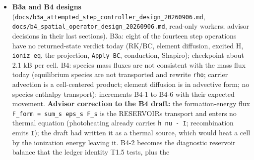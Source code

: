 \documentclass[english,a4paper]{my_memo}
\begin{document}
\begin{itemize}
  3.3e-8 at dt and 5.6e-9 at dt/16 on the old scale (crossing the 1e-8
  floor with the defect unchanged); now 1.0e-7 at every dt. Impact:
  \texttt{mol\_carrier}, \texttt{mol\_base\_handoff} identical; \texttt{oxygen\_chemistry} is refused
  at step 2 (CO row 5.5e-8 beside a clamped cell; 37 retry attempts to the
  floor, all refused, entry state restored), and the old measure only
  postponed that refusal to step 88 on today\textquotesingle s tree. Finding carried
  forward (A1scale2, needs its own impact measurement): with a
  dt-independent acceptance there is a shortest certifiable substep, since
  the Newton\textquotesingle s stopping test is still relative to the full terms and the
  round-off it leaves grows as 1/dt against the physical terms; the same
  measure in both places closes it. Also: \texttt{cterms} in \texttt{steady\_newton.f90}
  (534, 645) is written and never read.
  \textbf{Consequence for the matrix:} \texttt{oxygen\_chemistry} cannot run under the
  physical acceptance while the rateless CO ceiling is active (B1 decision
  7: exclusion); once A0-impl lands, the exhaustion action reads the run
  mode (initialization: record the refusal in the attempted ledger, write
  the state flagged, continue; physical: stop), which is the item A3b, and
  the case runs in \texttt{init} mode as the diagnostic it is.
\item
  \textbf{B3a and B4 designs} (\texttt{docs/b3a\_attempted\_step\_controller\_design\_20260906.md},
  \texttt{docs/b4\_spatial\_operator\_design\_20260906.md}, read-only workers; advisor
  decisions in their last sections). B3a: eight of the fourteen step
  operations have no returned-state verdict today (RK/BC, element diffusion,
  excited H, \texttt{ioniz\_eq}, the projection, \texttt{Apply\_BC}, conduction, Shapiro);
  checkpoint about 2.1 kB per cell. B4: species mass fluxes are not
  consistent with the mass flux today (equilibrium species are not
  transported and rewrite \texttt{rho}; carrier advection is a cell-centered
  product; element diffusion is in advective form; no species enthalpy
  transport); increments B4-1 to B4-6 with their expected movement.
  \textbf{Advisor correction to the B4 draft:} the formation-energy flux
  \texttt{F\_form\ =\ sum\_s\ eps\_s\ F\_s} is the RESERVOIR\textquotesingle s transport and enters no
  thermal equation (photoheating already carries \texttt{h\ nu\ -\ I}; recombination
  emits \texttt{I}); the draft had written it as a thermal source, which would
  heat a cell by the ionization energy leaving it. B4-2 becomes the
  diagnostic reservoir balance that the ledger identity T1.5 tests, plus the

\end{itemize}
\end{document}
